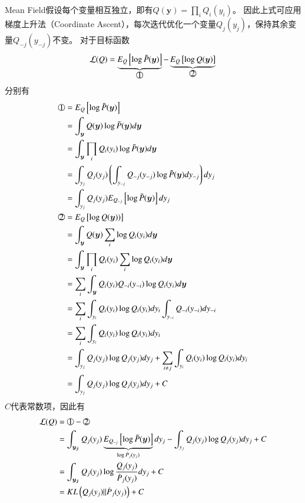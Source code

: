 Mean Field假设每个变量相互独立，即有$Q(\boldsymbol{y})=\prod_i{Q_i(y_i)}$。
因此上式可应用梯度上升法（Coordinate Ascent），每次迭代优化一个变量$Q_j(y_j)$，保持其余变量$Q_{-j}(y_{-j})$不变。
对于目标函数
\begin{equation}
	\mathcal{L}(Q)=\underbrace{E_{Q}\left[\log \tilde{P}(\boldsymbol{y})\right]}_{\tcircle{1}}-\underbrace{E_{Q}\left[\log Q(\boldsymbol{y})\right]}_{\tcircle{2}}
\end{equation}
分别有
\begin{equation}
	\begin{split}
		\tcircle{1}&=E_{Q}\left[\log \tilde{P}(\boldsymbol{y})\right]\\
		&=\int_{\boldsymbol{y}}Q(\boldsymbol{y}) \log \tilde{P}(\boldsymbol{y})d\boldsymbol{y}\\
		&=\int_{\boldsymbol{y}}\prod_i{Q_i(y_i)} \log \tilde{P}(\boldsymbol{y})d\boldsymbol{y}\\
		&=\int_{y_j}Q_j(y_j)\left(\int_{y_{-j}}Q_{-j}(y_{-j})\log \tilde{P}(\boldsymbol{y}) dy_{-j}\right) dy_j\\
		&=\int_{y_j}Q_j(y_j)E_{Q_{-j}}\left[\log \tilde{P}(\boldsymbol{y}) \right] dy_j\\
		\tcircle{2}&=E_{Q}\left[\log Q(\boldsymbol{y}))\right]\\
		&=\int_{\boldsymbol{y}}Q(\boldsymbol{y}) \sum_i\log Q_i(y_i) d\boldsymbol{y}\\
		&=\int_{\boldsymbol{y}}\prod_i{Q_i(y_i)} \sum_i\log Q_i(y_i) d\boldsymbol{y}\\
		&=\sum_i\int_{\boldsymbol{y}}Q_i(y_i)Q_{-i}(y_{-i})\log Q_i(y_i) d\boldsymbol{y}\\
		&=\sum_i\int_{y_i}Q_i(y_i)\log Q_i(y_i) dy_i\int_{y_{-i}} {Q_{-i}(y_{-i})}dy_{-i}\\
		&=\sum_i\int_{y_i}Q_i(y_i)\log Q_i(y_i) dy_i\\
		&=\int_{y_j}Q_j(y_j)\log Q_j(y_j) dy_j + \sum_{i\neq j}\int_{y_i}Q_i(y_i)\log Q_i(y_i) dy_i  \\
		&=\int_{y_j}Q_j(y_j)\log Q_j(y_j) dy_j + C
	\end{split}
\end{equation}
$C$代表常数项，因此有
\begin{equation}
	\begin{split}
		\mathcal{L}(Q)&=\tcircle{1}-\tcircle{2}\\
		&=\int_{\boldsymbol{y_j}}Q_j(y_j)\underbrace{E_{Q_{-j}}\left[\log \tilde{P}(\boldsymbol{y}) \right]}_{\log \dot{P}_j(y_j)} dy_j-\int_{y_j}Q_j(y_j)\log Q_j(y_j) dy_j +C\\
		&=\int_{\boldsymbol{y_j}}Q_j(y_j)\log\frac{Q_j(y_j)}{\dot{P}_j(y_j)} dy_j +C\\
		&=KL\left(Q_j(y_j)\|\dot{P}_j(y_j)\right)+C
	\end{split}
\end{equation}
